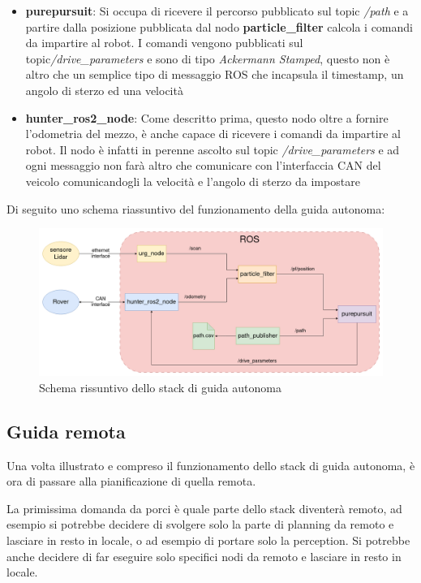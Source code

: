 \begin{itemize}
  \item \textbf{purepursuit}: Si occupa di ricevere il percorso pubblicato sul topic \textit{/path} e a partire dalla posizione pubblicata dal nodo \textbf{particle\_filter} calcola i comandi da impartire al robot. I comandi vengono pubblicati sul topic\textit{/drive\_parameters} e sono di tipo \textit{Ackermann Stamped}, questo non è altro che un semplice tipo di messaggio ROS che incapsula il timestamp, un angolo di sterzo ed una velocità
  \item \textbf{hunter\_ros2\_node}: Come descritto prima, questo nodo oltre a fornire l'odometria del mezzo, è anche capace di ricevere i comandi da impartire al robot. Il nodo è infatti in perenne ascolto sul topic \textit{/drive\_parameters} e ad ogni messaggio non farà altro che comunicare con l'interfaccia CAN del veicolo comunicandogli la velocità e l'angolo di sterzo da impostare
\end{itemize}

\noindent Di seguito uno schema riassuntivo del funzionamento della guida autonoma:
\begin{figure}[h]
  \centering
  \includegraphics[width=1\textwidth]{figures/schema_guida_autonoma.png}
  \caption{Schema rissuntivo dello stack di guida autonoma}
  \label{Schema rissuntivo dello stack di guida autonoma}
\end{figure}

\subsection{Guida remota}
Una volta illustrato e compreso il funzionamento dello stack di guida autonoma, è ora di passare alla pianificazione di quella remota.

\noindent La primissima domanda da porci è quale parte dello stack diventerà remoto, ad esempio si potrebbe decidere di svolgere solo la parte di planning da remoto e lasciare in resto in locale, o ad esempio di portare solo la perception. Si potrebbe anche decidere di far eseguire solo specifici nodi da remoto e lasciare in resto in locale.

